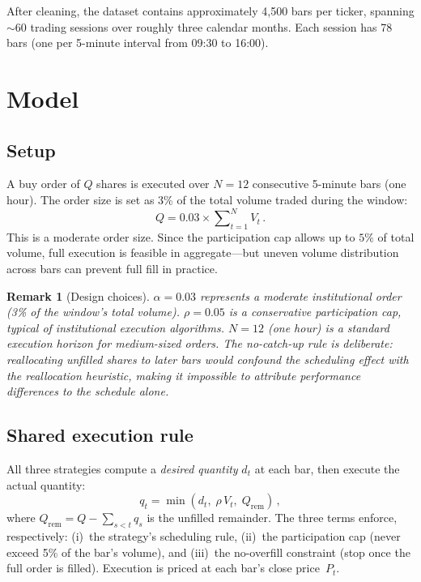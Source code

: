 \documentclass[10pt,twocolumn]{article}
\newtheorem{remark}{Remark}
\begin{document}
After cleaning, the dataset contains approximately 4{,}500 bars per ticker, spanning $\sim$60 trading sessions over roughly three calendar months. Each session has 78 bars (one per 5-minute interval from 09:30 to 16:00).


\section{Model}

\subsection{Setup}

A buy order of $Q$ shares is executed over $N\!=\!12$ consecutive 5-minute bars (one hour). The order size is set as 3\% of the total volume traded during the window:
\begin{equation}
Q = 0.03 \times \sum\nolimits_{t=1}^{N} V_t\,.
\end{equation}
This is a moderate order size. Since the participation cap allows up to $5\%$ of total volume, full execution is feasible in aggregate---but uneven volume distribution across bars can prevent full fill in practice.

\begin{remark}[Design choices]
$\alpha = 0.03$ represents a moderate institutional order (3\% of the window's total volume). $\rho = 0.05$ is a conservative participation cap, typical of institutional execution algorithms. $N = 12$ (one hour) is a standard execution horizon for medium-sized orders. The no-catch-up rule is deliberate: reallocating unfilled shares to later bars would confound the scheduling effect with the reallocation heuristic, making it impossible to attribute performance differences to the schedule alone.
\end{remark}

\subsection{Shared execution rule}

All three strategies compute a \emph{desired quantity} $d_t$ at each bar, then execute the actual quantity:
\begin{equation}
q_t = \min(d_t,\;\rho\, V_t,\;Q_{\text{rem}})\,,
\label{eq:exec}
\end{equation}
where $Q_{\text{rem}} = Q - \sum_{s<t} q_s$ is the unfilled remainder. The three terms enforce, respectively: (i)~the strategy's scheduling rule, (ii)~the participation cap (never exceed 5\% of the bar's volume), and (iii)~the no-overfill constraint (stop once the full order is filled). Execution is priced at each bar's close price~$P_t$.
\end{document}
